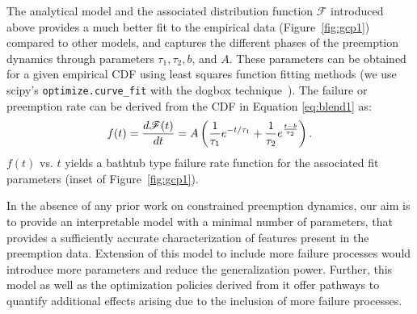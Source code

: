 The analytical model and the associated  distribution function $\mathscr{F}$ introduced above provides a much better fit to the empirical data (Figure~\ref{fig:gcp1}) compared to other models, and captures the different phases of the preemption dynamics through parameters $\tau_1, \tau_2, b$, and $A$. These parameters can be obtained for a given empirical CDF using least squares function fitting methods (we use scipy's \texttt{optimize.curve\_fit} with the dogbox technique~\cite{scipy-fit}). The failure or preemption rate can be derived from the CDF in Equation \ref{eq:blend1} as:
\begin{equation}
  \label{eq:failrate}
    \vspace*{\eqnspace}
f(t) = \dfrac{d \mathscr{F}(t)} {dt} = A \left(\dfrac{1}{\tau_1}e^{-t/\tau_1} + \dfrac{1}{\tau_2}e^{\frac{t-b}{\tau_2}}\right).
\end{equation}
$f(t)$ vs. $t$ yields a bathtub type failure rate function for the associated fit parameters (inset of Figure~\ref{fig:gcp1}).


In the absence of any prior work on constrained preemption dynamics, our aim is to provide an interpretable model with a minimal number of parameters, that provides a sufficiently accurate characterization of features present in the preemption data. 
Extension of this model to include more failure processes would introduce more parameters and reduce the generalization power. Further, this model as well as the optimization policies derived from it offer pathways to quantify additional effects arising due to the inclusion of more failure processes.  

